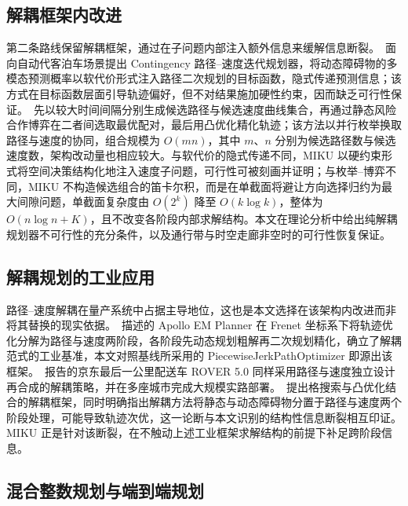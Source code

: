 \documentclass[a4paper,11pt]{ctexart}
\theoremstyle{definition}
\begin{document}
\subsection{解耦框架内改进}
\label{sec:related-decoupled}

第二条路线保留解耦框架，通过在子问题内部注入额外信息来缓解信息断裂。\citet{han2026_contingency}~面向自动代客泊车场景提出 Contingency 路径--速度迭代规划器，将动态障碍物的多模态预测概率以软代价形式注入路径二次规划的目标函数，隐式传递预测信息；该方式在目标函数层面引导轨迹偏好，但不对结果施加硬性约束，因而缺乏可行性保证。\citet{zhang2023_dp_rcg}~先以较大时间间隔分别生成候选路径与候选速度曲线集合，再通过静态风险合作博弈在二者间选取最优配对，最后用凸优化精化轨迹；该方法以并行枚举换取路径与速度的协同，组合规模为 $O(mn)$，其中 $m$、$n$ 分别为候选路径数与候选速度数，架构改动量也相应较大。与软代价的隐式传递不同，MIKU 以硬约束形式将空间决策结构化地注入速度子问题，可行性可被刻画并证明；与枚举--博弈不同，MIKU 不构造候选组合的笛卡尔积，而是在单截面将避让方向选择归约为最大间隙问题，单截面复杂度由 $O(2^k)$ 降至 $O(k\log k)$，整体为 $O(n\log n + K)$，且不改变各阶段内部求解结构。本文在理论分析中给出纯解耦规划器不可行性的充分条件，以及通行带与时空走廊非空时的可行性恢复保证。

\subsection{解耦规划的工业应用}
\label{sec:related-industrial}

路径--速度解耦在量产系统中占据主导地位，这也是本文选择在该架构内改进而非将其替换的现实依据。\citet{fan2018baidu}~描述的 Apollo EM Planner 在 Frenet 坐标系下将轨迹优化分解为路径与速度两阶段，各阶段先动态规划粗解再二次规划精化，确立了解耦范式的工业基准，本文对照基线所采用的 PiecewiseJerkPathOptimizer 即源出该框架。\citet{wang2022_jfr}~报告的京东最后一公里配送车 ROVER 5.0 同样采用路径与速度独立设计再合成的解耦策略，并在多座城市完成大规模实路部署。\citet{meng2019_access}~提出格搜索与凸优化结合的解耦框架，同时明确指出解耦方法将静态与动态障碍物分置于路径与速度两个阶段处理，可能导致轨迹次优，这一论断与本文识别的结构性信息断裂相互印证。MIKU 正是针对该断裂，在不触动上述工业框架求解结构的前提下补足跨阶段信息。

\subsection{混合整数规划与端到端规划}
\label{sec:related-supplement}
\end{document}
